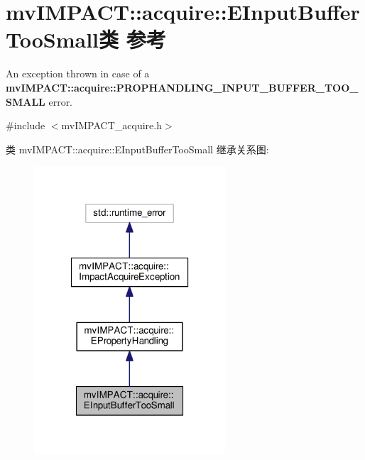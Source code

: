 \hypertarget{classmv_i_m_p_a_c_t_1_1acquire_1_1_e_input_buffer_too_small}{\section{mv\+I\+M\+P\+A\+C\+T\+:\+:acquire\+:\+:E\+Input\+Buffer\+Too\+Small类 参考}
\label{classmv_i_m_p_a_c_t_1_1acquire_1_1_e_input_buffer_too_small}
}


An exception thrown in case of a {\bfseries mv\+I\+M\+P\+A\+C\+T\+::acquire\+::\+P\+R\+O\+P\+H\+A\+N\+D\+L\+I\+N\+G\+\_\+\+I\+N\+P\+U\+T\+\_\+\+B\+U\+F\+F\+E\+R\+\_\+\+T\+O\+O\+\_\+\+S\+M\+A\+L\+L} error.  




{\ttfamily \#include $<$mv\+I\+M\+P\+A\+C\+T\+\_\+acquire.\+h$>$}



类 mv\+I\+M\+P\+A\+C\+T\+:\+:acquire\+:\+:E\+Input\+Buffer\+Too\+Small 继承关系图\+:
\nopagebreak
\begin{figure}[H]
\begin{center}
\leavevmode
\includegraphics[width=202pt]{classmv_i_m_p_a_c_t_1_1acquire_1_1_e_input_buffer_too_small__inherit__graph}
\end{center}
\end{figure}


